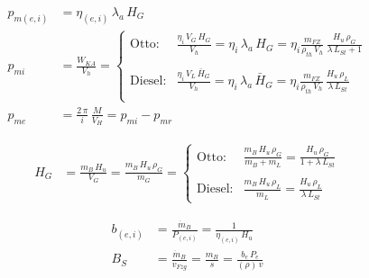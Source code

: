 \documentclass[english,threecolumn,color]{latex4ei/latex4ei_sheet}
\begin{document}
\begin{sectionbox}
	\begin{align*}
	p_{m(e,i)}&=\eta_{(e,i)}\, \lambda_a \, H_G\\
	p_{mi}&= \frac{W_{KA}}{V_h}
	=\begin{cases}
		\text{Otto:}&\frac{\eta_i \, V_G \, H_G}{V_h} = \eta_i \, \lambda_a \, H_G = \eta_i \frac{m_{FZ}}{\rho_{th} \,  V_h} \, \frac{H_u \, \rho_{G}}{\lambda\, L_{St}+1}\\\\
		\text{Diesel:}&\frac{\eta_i \,V_L \, \bar{H}_G}{V_h} = \eta_i \, \lambda_a \,\bar{H}_G= \eta_i \frac{m_{FZ}}{\rho_{th} \,  V_h} \, \frac{H_u \, \rho_{L}}{\lambda\, L_{St}}\\
	\end{cases}\\
	p_{me}&= \frac{2\,\pi}{i}\, \frac{M}{V_H}= p_{mi} - p_{mr}
	\end{align*}
\end{sectionbox}
\begin{sectionbox}
	\begin {align*}
		H_G &= \frac{m_B \, H_u}{V_G} =\frac{m_B \, H_u \, \rho_G}{m_G}
		=\begin{cases}
			\text{Otto:}&\frac{m_B \, H_u \, \rho_G}{m_B + m_L} =\frac{H_u \, \rho_G}{1+\lambda\, L_{St}}\\ \\
			\text{Diesel:}&\frac{m_B \, H_u \, \rho_L}{m_L} =\frac{H_u \, \rho_L}{\lambda \, L_{St}}
		\end{cases}
	\end{align*}
\end{sectionbox}
\begin{sectionbox}
	\begin{align*}
		b_{(e,i)}&=\frac{\dot{m}_B}{P_{(e,i)}}=\frac{1}{\eta_{(e,i)} \, H_u}\\ %
		B_S &= \frac{\dot{m}_B}{v_{Fzg}}=\frac{m_B}{s}=\frac{b_e \, P_e}{(\rho) \, v}
	\end{align*}
\end{sectionbox}
\end{document}
